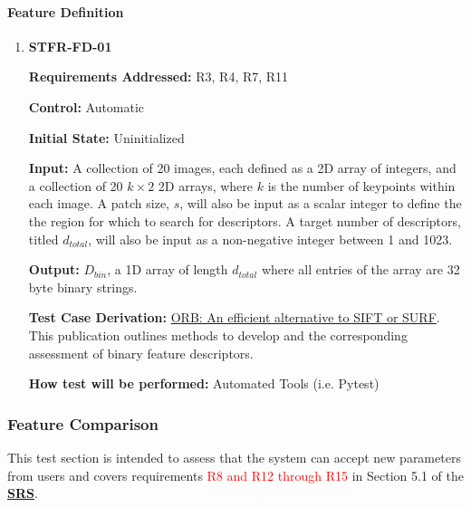 \documentclass[12pt, titlepage]{article}
\begin{document}
\paragraph{Feature Definition}
\begin{enumerate}
\item \hypertarget{STFR-FD-01}{\textbf{STFR-FD-01}\\}
\textbf{Requirements Addressed:} R3, R4, R7, R11

\textbf{Control:} Automatic

\textbf{Initial State:} Uninitialized

\textbf{Input:} A collection of 20 images, each defined as a 2D array of integers, and a collection of 20 
$k\times 2$ 2D arrays, where $k$ is the number of keypoints within each image. A patch size, $s$, 
will also be input as a scalar integer to define the the region for which to search for descriptors. A target 
number of descriptors, titled $d_{total}$, will also be input as a non-negative integer between 1 and 1023.

\textbf{Output:} $D_{bin}$, a 1D array of length $d_{total}$ where all entries of the array are 32 byte binary strings. 

\textbf{Test Case Derivation:} \href{https://sites.cc.gatech.edu/classes/AY2024/cs4475_summer/images/ORB_an_efficient_alternative_to_SIFT_or_SURF.pdf}
{ORB: An efficient alternative to SIFT or SURF}. This publication outlines methods 
to develop and the corresponding assessment of binary feature descriptors.

\textbf{How test will be performed:} Automated Tools (i.e. Pytest)
\end{enumerate}

\subsubsection{Feature Comparison}

This test section is intended to assess that the system can accept new parameters from users and covers 
requirements \textcolor{red}{R8 and R12 through R15} in Section 5.1 of the 
\textbf{\href{https://github.com/KiranSingh15/CAS-741-Image-Correspondences/blob/main/docs/SRS/SRS.pdf}
{SRS}}. 
		
\end{document}
